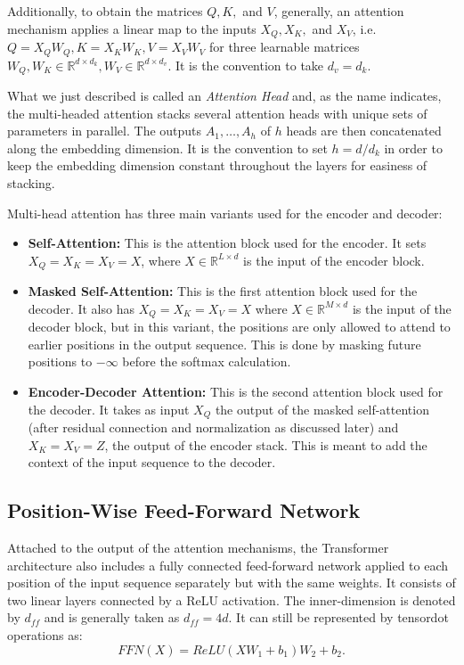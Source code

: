 Additionally, to obtain the matrices $Q, K,$ and $V$, generally, an attention mechanism applies a linear map to the inputs $X_Q, X_K,$ and $X_V$, i.e. $Q = X_QW_Q, K=X_KW_K, V=X_VW_V$ for three learnable matrices $W_Q, W_K \in \mathbb{R}^{d \times d_k}, W_V \in \mathbb{R}^{d \times d_v} $. It is the convention to take $d_v = d_k$.


What we just described is called an \textit{Attention Head} and, as the name indicates, the multi-headed attention stacks several attention heads with unique sets of parameters in parallel. The outputs $A_1, \ldots, A_h$ of $h$ heads are then concatenated along the embedding dimension. It is the convention to set $h = d / d_k$ in order to keep the embedding dimension constant throughout the layers for easiness of stacking.

Multi-head attention has three main variants used for the encoder and decoder:
\begin{itemize}
    \item \textbf{Self-Attention:} This is the attention block used for the encoder. It sets $X_Q = X_K = X_V = X$, where $X \in \mathbb{R}^{L \times d}$ is the input of the encoder block.
    \item \textbf{Masked Self-Attention:} This is the first attention block used for the decoder. It also has $X_Q = X_K = X_V = X$ where $X \in \mathbb{R}^{M \times d}$ is the input of the decoder block, but in this variant, the positions are only allowed to attend to earlier positions in the output sequence. This is done by masking future positions to $-\infty$ before the softmax calculation.
    \item \textbf{Encoder-Decoder Attention:} This is the second attention block used for the decoder. It takes as input $X_Q$ the output of the masked self-attention (after residual connection and normalization as discussed later) and $X_K = X_V = Z$, the output of the encoder stack. This is meant to add the context of the input sequence to the decoder.
\end{itemize}


\subsection{Position-Wise Feed-Forward Network}

Attached to the output of the attention mechanisms, the Transformer architecture also includes a fully connected feed-forward network applied to each position of the input sequence separately but with the same weights. It consists of two linear layers connected by a ReLU activation. The inner-dimension is denoted by $d_{ff}$ and is generally taken as $d_{ff} = 4d$. It can still be represented by tensordot operations as:
$$
FFN(X) = ReLU(XW_1 + b_1)W_2 + b_2.
$$ 

